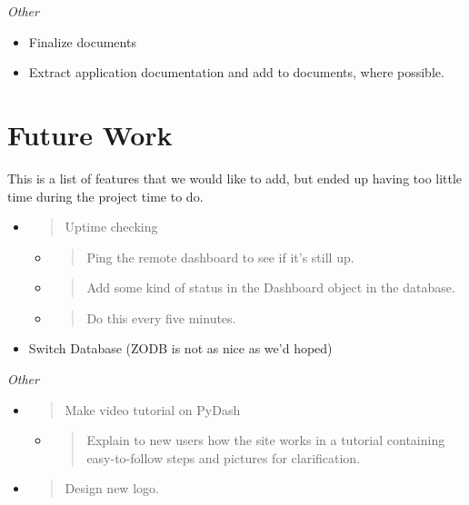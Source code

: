 \emph{Other}
\begin{itemize}
\item Finalize documents
\item Extract application documentation and add to documents, where possible.
\end{itemize}




\hypertarget{backlog}{%
\section{Future Work}\label{backlog}}

This is a list of features that we would like to add, but ended up having too little time during the project time to do.

\begin{itemize}
\item
  \begin{quote}
  Uptime checking
  \end{quote}

  \begin{itemize}
  \item
    \begin{quote}
    Ping the remote dashboard to see if it's still up.
    \end{quote}
  \item
    \begin{quote}
    Add some kind of status in the Dashboard object in the database.
    \end{quote}
  \item
    \begin{quote}
    Do this every five minutes.
    \end{quote}
  \end{itemize}
\item Switch Database (ZODB is not as nice as we'd hoped)   
\end{itemize}

\emph{Other}

\begin{itemize}
\item
  \begin{quote}
  Make video tutorial on PyDash
  \end{quote}

  \begin{itemize}
  \item
    \begin{quote}
    Explain to new users how the site works in a tutorial containing
    easy-to-follow steps and pictures for clarification.
    \end{quote}
  \end{itemize}
\item
  \begin{quote}
  Design new logo.
  \end{quote}
\end{itemize}


